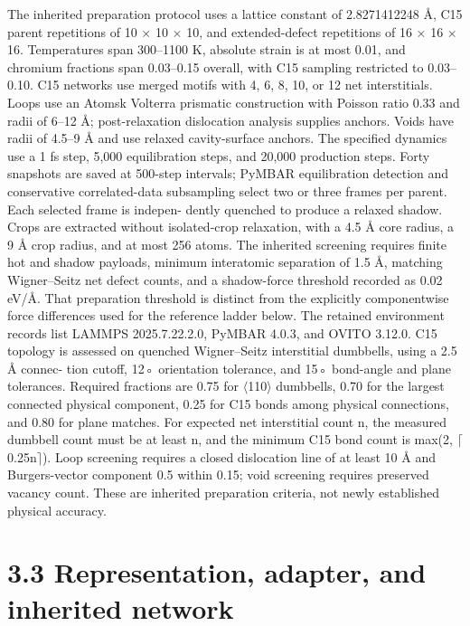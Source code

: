\documentclass[11pt]{article}
\begin{document}
The inherited preparation protocol uses a lattice constant of 2.8271412248 Å, C15 parent repetitions
of 10 \ensuremath{\times} 10 \ensuremath{\times} 10, and extended-defect repetitions of 16 \ensuremath{\times} 16 \ensuremath{\times} 16. Temperatures span 300–1100 K,
absolute strain is at most 0.01, and chromium fractions span 0.03–0.15 overall, with C15 sampling
restricted to 0.03–0.10. C15 networks use merged motifs with 4, 6, 8, 10, or 12 net interstitials.
Loops use an Atomsk Volterra prismatic construction with Poisson ratio 0.33 and radii of 6–12 Å;
post-relaxation dislocation analysis supplies anchors. Voids have radii of 4.5–9 Å and use relaxed
cavity-surface anchors.
The specified dynamics use a 1 fs step, 5,000 equilibration steps, and 20,000 production steps.
Forty snapshots are saved at 500-step intervals; PyMBAR equilibration detection and conservative
correlated-data subsampling select two or three frames per parent. Each selected frame is indepen-
dently quenched to produce a relaxed shadow. Crops are extracted without isolated-crop relaxation,
with a 4.5 Å core radius, a 9 Å crop radius, and at most 256 atoms. The inherited screening requires
finite hot and shadow payloads, minimum interatomic separation of 1.5 Å, matching Wigner–Seitz
net defect counts, and a shadow-force threshold recorded as 0.02 eV/Å. That preparation threshold
is distinct from the explicitly componentwise force differences used for the reference ladder below.
The retained environment records list LAMMPS 2025.7.22.2.0, PyMBAR 4.0.3, and OVITO 3.12.0.
C15 topology is assessed on quenched Wigner–Seitz interstitial dumbbells, using a 2.5 Å connec-
tion cutoff, 12◦ orientation tolerance, and 15◦ bond-angle and plane tolerances. Required fractions
are 0.75 for \ensuremath{\langle}110\ensuremath{\rangle} dumbbells, 0.70 for the largest connected physical component, 0.25 for C15 bonds
among physical connections, and 0.80 for plane matches. For expected net interstitial count n, the
measured dumbbell count must be at least n, and the minimum C15 bond count is max(2, \ensuremath{\lceil}0.25n\ensuremath{\rceil}).
Loop screening requires a closed dislocation line of at least 10 Å and Burgers-vector component
0.5 within 0.15; void screening requires preserved vacancy count. These are inherited preparation
criteria, not newly established physical accuracy.

\section*{3.3 Representation, adapter, and inherited network}
\end{document}
